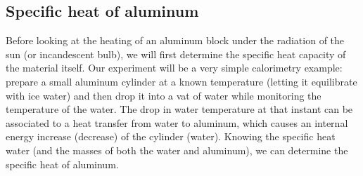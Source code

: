 \subsection{Specific heat of aluminum}

Before looking at the heating of an aluminum block under the radiation of the sun (or incandescent bulb), we will first determine the specific heat capacity of the material itself.  Our experiment will be a very simple calorimetry example: prepare a small aluminum cylinder at a known temperature (letting it equilibrate with ice water) and then drop it into a vat of water while monitoring the temperature of the water.  The drop in water temperature at that instant can be associated to a heat transfer from water to aluminum, which causes an internal energy increase (decrease) of the cylinder (water). Knowing the specific heat water (and the masses of both the water and aluminum), we can determine the specific heat of aluminum.  

